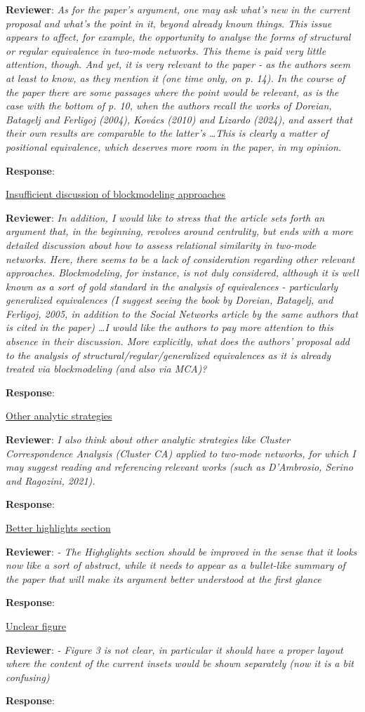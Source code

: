 \documentclass{article}
\begin{document}
\textbf{Reviewer}: \textit{As for the paper's argument, one may ask what's new in the current proposal and what's the point in it, beyond already known things. This issue appears to affect, for example, the opportunity to analyse the forms of structural or regular equivalence in two-mode networks. This theme is paid very little attention, though. And yet, it is very relevant to the paper - as the authors seem at least to know, as they mention it (one time only, on p. 14). In the course of the paper there are some passages where the point would be relevant, as is the case with the bottom of p. 10, when the authors recall the works of Doreian, Batagelj and Ferligoj (2004), Kovács (2010) and Lizardo (2024), and assert that their own results are comparable to the latter's \ldots This is clearly a matter of positional equivalence, which deserves more room in the paper, in my opinion.}

\textbf{Response}:

\underline{Insufficient discussion of blockmodeling approaches}

\textbf{Reviewer}: \textit{In addition, I would like to stress that the article sets forth an argument that, in the beginning, revolves around centrality, but ends with a more detailed discussion about how to assess relational similarity in two-mode networks. Here, there seems to be a lack of consideration regarding other relevant approaches. Blockmodeling, for instance, is not duly considered, although it is well known as a sort of gold standard in the analysis of equivalences - particularly generalized equivalences (I suggest seeing the book by Doreian, Batagelj, and Ferligoj, 2005, in addition to the Social Networks article by the same authors that is cited in the paper) \ldots I would like the authors to pay more attention to this absence in their discussion. More explicitly, what does the authors' proposal add to the analysis of structural/regular/generalized equivalences as it is already treated via blockmodeling (and also via MCA)?}

\textbf{Response}:

\underline{Other analytic strategies}

\textbf{Reviewer}: \textit{I also think about other analytic strategies like Cluster Correspondence Analysis (Cluster CA) applied to two-mode networks, for which I may suggest reading and referencing relevant works (such as D'Ambrosio, Serino and Ragozini, 2021).}

\textbf{Response}:

\underline{Better highlights section}

\textbf{Reviewer}: \textit{- The Highglights section should be improved in the sense that it looks now like a sort of abstract, while it needs to appear as a bullet-like summary of the paper that will make its argument better understood at the first glance}

\textbf{Response}:

\underline{Unclear figure}

\textbf{Reviewer}: \textit{- Figure 3 is not clear, in particular it should have a proper layout where the content of the current insets would be shown separately (now it is a bit confusing)}

\textbf{Response}:
\end{document}
